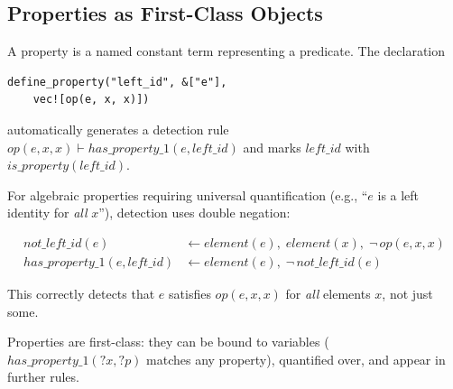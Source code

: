 \subsection{Properties as First-Class Objects}

A property is a named constant term representing a predicate. The declaration

\begin{verbatim}
define_property("left_id", &["e"],
    vec![op(e, x, x)])
\end{verbatim}

\noindent automatically generates a detection rule $\mathit{op}(e, x, x) \vdash \mathit{has\_property\_1}(e, \mathit{left\_id})$ and marks $\mathit{left\_id}$ with $\mathit{is\_property}(\mathit{left\_id})$.

For algebraic properties requiring universal quantification (e.g., ``$e$ is a left identity for \emph{all} $x$''), detection uses double negation:

\begin{align*}
\mathit{not\_left\_id}(e) &\leftarrow \mathit{element}(e),\; \mathit{element}(x),\; \lnot\, \mathit{op}(e, x, x) \\
\mathit{has\_property\_1}(e, \mathit{left\_id}) &\leftarrow \mathit{element}(e),\; \lnot\, \mathit{not\_left\_id}(e)
\end{align*}

This correctly detects that $e$ satisfies $\mathit{op}(e, x, x)$ for \emph{all} elements $x$, not just some.

Properties are first-class: they can be bound to variables ($\mathit{has\_property\_1}(?x, ?p)$ matches any property), quantified over, and appear in further rules.
